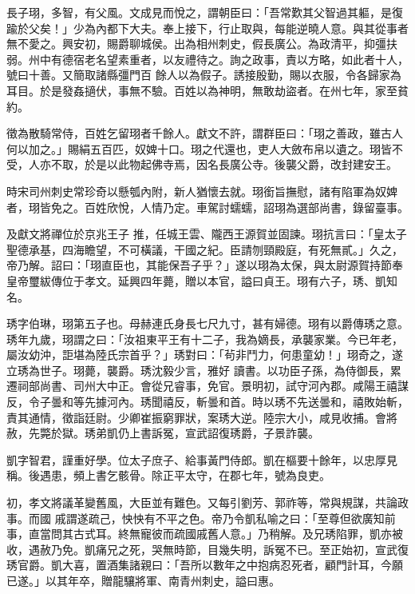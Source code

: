 \begin{pinyinscope}
 長子珝，多智，有父風。文成見而悅之，謂朝臣曰：「吾常歎其父智過其軀，是復踰於父矣！」少為內都下大夫。奉上接下，行止取與，每能逆曉人意。與其從事者無不愛之。興安初，賜爵聊城侯。出為相州刺史，假長廣公。為政清平，抑彊扶弱。州中有德宿老名望素重者，以友禮待之。詢之政事，責以方略，如此者十人，號曰十善。又簡取諸縣彊門百
 餘人以為假子。誘接殷勤，賜以衣服，令各歸家為耳目。於是發姦擿伏，事無不驗。百姓以為神明，無敢劫盜者。在州七年，家至貧約。



 徵為散騎常侍，百姓乞留珝者千餘人。獻文不許，謂群臣曰：「珝之善政，雖古人何以加之。」賜絹五百匹，奴婢十口。珝之代還也，吏人大斂布帛以遺之。珝皆不受，人亦不取，於是以此物起佛寺焉，因名長廣公寺。後襲父爵，改封建安王。



 時宋司州刺史常珍奇以懸瓠內附，新人猶懷去就。珝銜旨撫慰，諸有陷軍為奴婢者，珝皆免之。百姓欣悅，人情乃定。車駕討蠕蠕，詔珝為選部尚書，錄留臺事。



 及獻文將禪位於京兆王子
 推，任城王雲、隴西王源賀並固諫。珝抗言曰：「皇太子聖德承基，四海瞻望，不可橫議，干國之紀。臣請刎頸殿庭，有死無貳。」久之，帝乃解。詔曰：「珝直臣也，其能保吾子乎？」遂以珝為太保，與太尉源賀持節奉皇帝璽紱傳位于孝文。延興四年薨，贈以本官，謚曰貞王。珝有六子，琇、凱知名。



 琇字伯琳，珝第五子也。母赫連氏身長七尺九寸，甚有婦德。珝有以爵傳琇之意。琇年九歲，珝謂之曰：「汝祖東平王有十二子，我為嫡長，承襲家業。今已年老，屬汝幼沖，詎堪為陸氏宗首乎？」琇對曰：「茍非鬥力，何患童幼！」珝奇之，遂立琇為世子。珝薨，襲爵。琇沈毅少言，雅好
 讀書。以功臣子孫，為侍御長，累遷祠部尚書、司州大中正。會從兄睿事，免官。景明初，試守河內郡。咸陽王禧謀反，令子曇和等先據河內。琇聞禧反，斬曇和首。時以琇不先送曇和，禧敗始斬，責其通情，徵詣廷尉。少卿崔振窮罪狀，案琇大逆。陸宗大小，咸見收捕。會將赦，先斃於獄。琇弟凱仍上書訴冤，宣武詔復琇爵，子景詐襲。



 凱字智君，謹重好學。位太子庶子、給事黃門侍郎。凱在樞要十餘年，以忠厚見稱。後遇患，頻上書乞骸骨。除正平太守，在郡七年，號為良吏。



 初，孝文將議革變舊風，大臣並有難色。又每引劉芳、郭祚等，常與規謀，共論政事。而國
 戚謂遂疏己，怏怏有不平之色。帝乃令凱私喻之曰：「至尊但欲廣知前事，直當問其古式耳。終無寵彼而疏國戚舊人意。」乃稍解。及兄琇陷罪，凱亦被收，遇赦乃免。凱痛兄之死，哭無時節，目幾失明，訴冤不已。至正始初，宣武復琇官爵。凱大喜，置酒集諸親曰：「吾所以數年之中抱病忍死者，顧門計耳，今願已遂。」以其年卒，贈龍驤將軍、南青州刺史，謚曰惠。




\end{pinyinscope}
